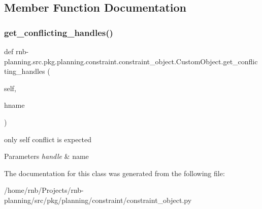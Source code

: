 \subsection{Member Function Documentation}
\mbox{\label{classrnb-planning_1_1src_1_1pkg_1_1planning_1_1constraint_1_1constraint__object_1_1_custom_object_aba29329033ebc4367ba4709691a227d4}} 
\subsubsection{\texorpdfstring{get\+\_\+conflicting\+\_\+handles()}{get\_conflicting\_handles()}}
{\footnotesize\ttfamily def rnb-\/planning.\+src.\+pkg.\+planning.\+constraint.\+constraint\+\_\+object.\+Custom\+Object.\+get\+\_\+conflicting\+\_\+handles (\begin{DoxyParamCaption}\item[{}]{self,  }\item[{}]{hname }\end{DoxyParamCaption})}



only self conflict is expected 


\begin{DoxyParams}{Parameters}
{\em handle} & name \\
\hline
\end{DoxyParams}


The documentation for this class was generated from the following file\+:\begin{DoxyCompactItemize}
\item 
/home/rnb/\+Projects/rnb-\/planning/src/pkg/planning/constraint/constraint\+\_\+object.\+py\end{DoxyCompactItemize}
